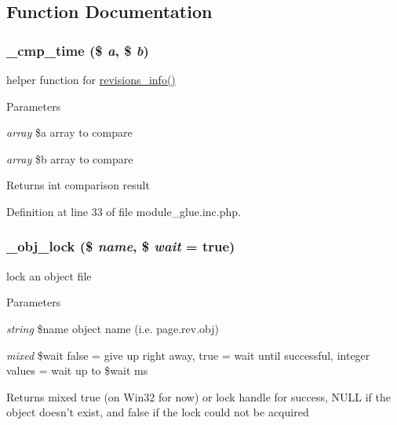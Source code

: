 \subsection{Function Documentation}
\hypertarget{module__glue_8inc_8php_a5fea6c120a24a298149febcbf3b1df10}{
\subsubsection[{\_\-cmp\_\-time}]{\setlength{\rightskip}{0pt plus 5cm}\_\-cmp\_\-time (\$ {\em a}, \/  \$ {\em b})}}
\label{module__glue_8inc_8php_a5fea6c120a24a298149febcbf3b1df10}
helper function for \hyperlink{module__glue_8inc_8php_a1dc65b69a920ac4ebc8f7c1df305060b}{revisions\_\-info()}


\begin{DoxyParams}{Parameters}
\item[{\em array}]\$a array to compare \item[{\em array}]\$b array to compare \end{DoxyParams}
\begin{DoxyReturn}{Returns}
int comparison result 
\end{DoxyReturn}


Definition at line 33 of file module\_\-glue.inc.php.

\hypertarget{module__glue_8inc_8php_a21f260355b875069ca90edf1f9a559d0}{
\subsubsection[{\_\-obj\_\-lock}]{\setlength{\rightskip}{0pt plus 5cm}\_\-obj\_\-lock (\$ {\em name}, \/  \$ {\em wait} = {\ttfamily true})}}
\label{module__glue_8inc_8php_a21f260355b875069ca90edf1f9a559d0}
lock an object file


\begin{DoxyParams}{Parameters}
\item[{\em string}]\$name object name (i.e. page.rev.obj) \item[{\em mixed}]\$wait false = give up right away, true = wait until successful, integer values = wait up to \$wait ms \end{DoxyParams}
\begin{DoxyReturn}{Returns}
mixed true (on Win32 for now) or lock handle for success, NULL if the object doesn't exist, and false if the lock could not be acquired 
\end{DoxyReturn}


